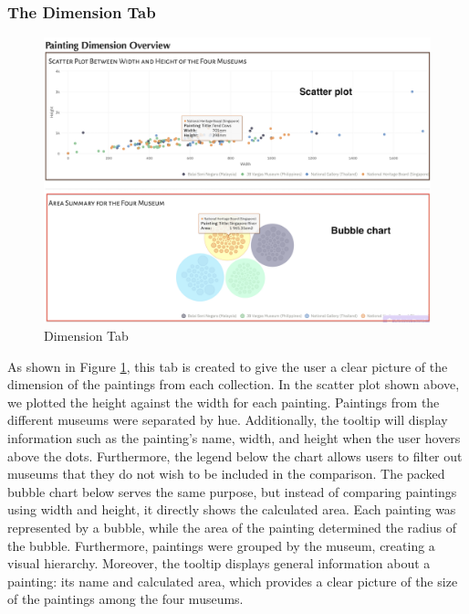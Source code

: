 \documentclass[11pt, oneside]{article}
\begin{document}
\subsubsection{The Dimension Tab}
\begin{figure}[H]
    \centering
    \includegraphics[scale=0.28]{images/dimension_screenshot.png}
    \caption{Dimension Tab}
    \label{dimension_tab}
\end{figure}

As shown in Figure \ref{dimension_tab}, this tab is created to give the user a clear picture of the dimension of the paintings from each collection. In the scatter plot shown above, we plotted the height against the width for each painting. Paintings from the different museums were separated by hue. Additionally, the tooltip will display information such as the painting's name, width, and height when the user hovers above the dots. Furthermore, the legend below the chart allows users to filter out museums that they do not wish to be included in the comparison.
\bigbreak
\noindent The packed bubble chart below serves the same purpose, but instead of comparing paintings using width and height, it directly shows the calculated area. Each painting was represented by a bubble, while the area of the painting determined the radius of the bubble. Furthermore, paintings were grouped by the museum, creating a visual hierarchy. Moreover, the tooltip displays general information about a painting: its name and calculated area, which provides a clear picture of the size of the paintings among the four museums.
\end{document}
